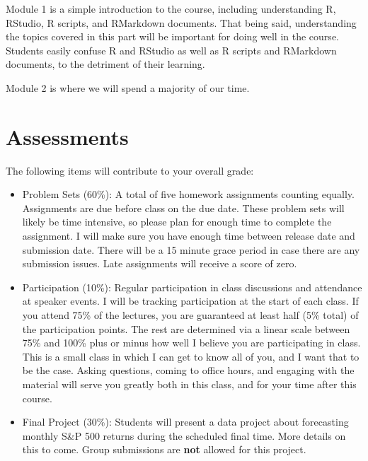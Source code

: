 \documentclass[11pt]{article}
\begin{document}
Module 1 is a simple introduction to the course, including understanding R, RStudio, R scripts, and RMarkdown documents. That being said, understanding the topics covered in this part will be important for doing well in the course. Students easily confuse R and RStudio as well as R scripts and RMarkdown documents, to the detriment of their learning.

Module 2 is where we will spend a majority of our time. 

\section*{Assessments}
The following items will contribute to your overall grade:

\begin{itemize}
    
    \item Problem Sets (60\%): A total of five homework assignments counting equally. Assignments are due before class on the due date. These problem sets will likely be time intensive, so please plan for enough time to complete the assignment. I will make sure you have enough time between release date and submission date. There will be a 15 minute grace period in case there are any submission issues. Late assignments will receive a score of zero. 
    
    \item Participation (10\%): Regular participation in class discussions and attendance at speaker events. I will be tracking participation at the start of each class. If you attend 75\% of the lectures, you are guaranteed at least half (5\% total) of the participation points. The rest are determined via a linear scale between 75\% and 100\% plus or minus how well I believe you are participating in class. This is a small class in which I can get to know all of you, and I want that to be the case. Asking questions, coming to office hours, and engaging with the material will serve you greatly both in this class, and for your time after this course.
        
    \item Final Project (30\%): Students will present a data project about forecasting monthly S\&P 500 returns during the scheduled final time. More details on this to come. Group submissions are \textbf{not} allowed for this project. 
\end{itemize}
\end{document}
